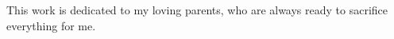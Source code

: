 
\begin{dedication} %

This work is dedicated to my loving parents, who are always ready to sacrifice everything for me.


\end{dedication}


